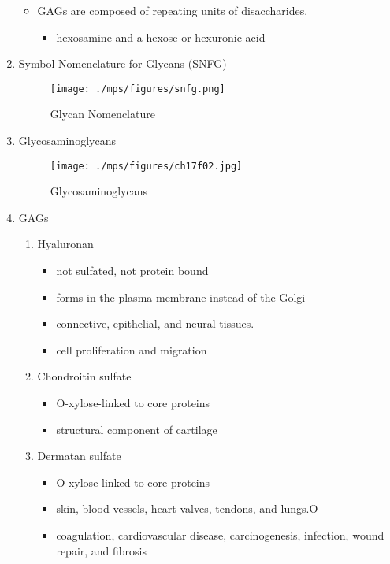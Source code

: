 \documentclass{scrartcl}
\begin{document}
\begin{enumerate}
\begin{itemize}
\item GAGs are composed of repeating units of disaccharides.
\begin{itemize}
\item hexosamine and a hexose or hexuronic acid
\end{itemize}
\end{itemize}

\item Symbol Nomenclature for Glycans (SNFG)
\label{sec:orgcf251aa}

\begin{figure}[htbp]
\centering
\texttt{[image: ./mps/figures/snfg.png]}
\caption[Glycan Nomenclature]{\label{fig:orgcf31045}
Glycan Nomenclature}
\end{figure}


\item Glycosaminoglycans
\label{sec:orgd8ee5d6}

\begin{figure}[htbp]
\centering
\texttt{[image: ./mps/figures/ch17f02.jpg]}
\caption[Glycosaminoglycans]{\label{fig:orgb52b850}
Glycosaminoglycans}
\end{figure}

\item GAGs
\label{sec:orge32e79a}

\begin{enumerate}
\item Hyaluronan
\label{sec:org4ebe49b}
\begin{itemize}
\item not sulfated, not protein bound
\item forms in the plasma membrane instead of the Golgi
\item connective, epithelial, and neural tissues.
\item cell proliferation and migration
\end{itemize}

\item Chondroitin sulfate
\label{sec:orgc1aeeb1}
\begin{itemize}
\item O-xylose-linked to core proteins
\item structural component of cartilage
\end{itemize}

\item Dermatan sulfate
\label{sec:org447570d}
\begin{itemize}
\item O-xylose-linked to core proteins
\item skin, blood vessels, heart valves, tendons, and lungs.O
\item coagulation, cardiovascular disease, carcinogenesis, infection, wound repair, and fibrosis
\end{itemize}
\end{enumerate}


\end{enumerate}
\end{document}

